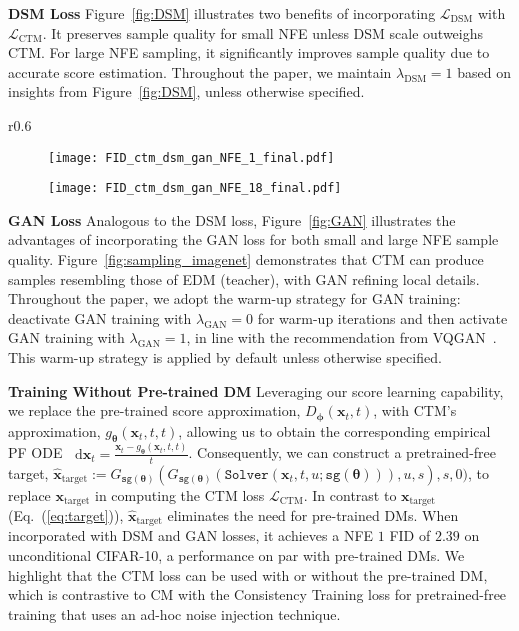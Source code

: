 \documentclass{article} \usepackage{iclr2024_coNFErence,times}
\def\eqref#1{equation~\ref{#1}}
\def\eqref#1{(\ref{#1})}
\def\eqref#1{(\ref{#1})}
\theoremstyle{definition}
\theoremstyle{remark}
\newcommand*\diff{\mathop{}\!\mathrm{d}}
\begin{document}
 
\textbf{DSM Loss } Figure~\ref{fig:DSM} illustrates two benefits of incorporating $\mathcal{L}_{\text{DSM}}$ with $\mathcal{L}_{\text{CTM}}$. It preserves sample quality for small NFE unless DSM scale outweighs CTM. For large NFE sampling, it significantly improves sample quality due to accurate score estimation. Throughout the paper, we maintain $\lambda_{\text{DSM}}=1$ based on insights from Figure~\ref{fig:DSM}, unless otherwise specified.


\begin{wrapfigure}{r}{0.6\textwidth}
\vskip -0.2in
\centering
\begin{subfigure}{0.48\linewidth}
\centering
		\texttt{[image: FID\_ctm\_dsm\_gan\_NFE\_1\_final.pdf]}
	\end{subfigure}	
	\begin{subfigure}{0.48\linewidth}
		\centering
		\texttt{[image: FID\_ctm\_dsm\_gan\_NFE\_18\_final.pdf]}
	\end{subfigure}	
\vskip -0.05in
 \caption{The effect of GAN loss.}
	\label{fig:GAN}
  \vskip -0.2in
 \end{wrapfigure}
\textbf{GAN Loss } Analogous to the DSM loss, Figure~\ref{fig:GAN} illustrates the advantages of incorporating the GAN loss for both small and large NFE sample quality. Figure~\ref{fig:sampling_imagenet} demonstrates that CTM can produce samples resembling those of EDM (teacher), with GAN refining local details. Throughout the paper, we adopt the warm-up strategy for GAN training: deactivate GAN training with $\lambda_{\text{GAN}}=0$ for warm-up iterations and then activate GAN training with $\lambda_{\text{GAN}}=1$, in line with the recommendation from VQGAN~\citep{esser2021taming}. This warm-up strategy is applied by default unless otherwise specified.



\textbf{Training Without Pre-trained DM } Leveraging our score learning capability, we replace the pre-trained score approximation, $D_{\bm{\phi}}(\mathbf{x}_{t},t)$, with CTM's approximation, $g_{\bm{\theta}}(\mathbf{x}_{t},t,t)$, allowing us to obtain the corresponding empirical PF ODE $\diff\mathbf{x}_{t}=\frac{\mathbf{x}_{t}-g_{\bm{\theta}}(\mathbf{x}_{t},t,t)}{t}$. Consequently, we can construct a pretrained-free target, $\hat{\mathbf{x}}_{\text{target}}:=G_{\texttt{sg}(\bm{\theta})}(G_{\texttt{sg}(\bm{\theta})}(\texttt{Solver}(\mathbf{x}_{t},t,u;\texttt{sg}(\bm{\theta}))),u,s),s,0)$, to replace $\mathbf{x}_{\text{target}}$ in computing the CTM loss $\mathcal{L}_{\text{CTM}}$. In contrast to $\mathbf{x}_{\text{target}}$ (Eq.~\eqref{eq:target}), $\hat{\mathbf{x}}_{\text{target}}$ eliminates the need for pre-trained DMs. When incorporated with DSM and GAN losses, it achieves a NFE $1$ FID of $2.39$ on unconditional CIFAR-10, a performance on par with pre-trained DMs. We highlight that the CTM loss can be used with or without the pre-trained DM, which is contrastive to CM with the Consistency Training loss for pretrained-free training that uses an ad-hoc noise injection technique.
\end{document}
